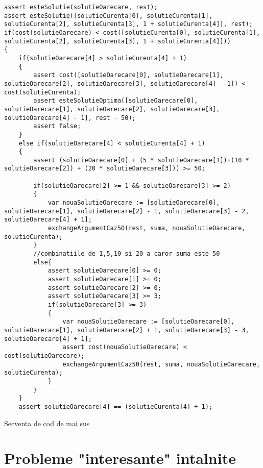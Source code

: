 \begin{enumerate}
\begin{lstlisting}
assert esteSolutie(solutieOarecare, rest);
assert esteSolutie([solutieCurenta[0], solutieCurenta[1], solutieCurenta[2], solutieCurenta[3], 1 + solutieCurenta[4]], rest);
if(cost(solutieOarecare) < cost([solutieCurenta[0], solutieCurenta[1], solutieCurenta[2], solutieCurenta[3], 1 + solutieCurenta[4]]))
{
	if(solutieOarecare[4] > solutieCurenta[4] + 1)
	{
		assert cost([solutieOarecare[0], solutieOarecare[1], solutieOarecare[2], solutieOarecare[3], solutieOarecare[4] - 1]) < cost(solutieCurenta);
		assert esteSolutieOptima([solutieOarecare[0], solutieOarecare[1], solutieOarecare[2], solutieOarecare[3], solutieOarecare[4] - 1], rest - 50);
		assert false;
	}
	else if(solutieOarecare[4] < solutieCurenta[4] + 1)
	{
		assert (solutieOarecare[0] + (5 * solutieOarecare[1])+(10 * solutieOarecare[2]) + (20 * solutieOarecare[3])) >= 50;
		
		if(solutieOarecare[2] >= 1 && solutieOarecare[3] >= 2)
		{
			var nouaSolutieOarecare := [solutieOarecare[0], solutieOarecare[1], solutieOarecare[2] - 1, solutieOarecare[3] - 2, solutieOarecare[4] + 1];
			exchangeArgumentCaz50(rest, suma, nouaSolutieOarecare, solutieCurenta);
		}
		//combinatiile de 1,5,10 si 20 a caror suma este 50
		else{
			assert solutieOarecare[0] >= 0;
			assert solutieOarecare[1] >= 0;
			assert solutieOarecare[2] >= 0;
			assert solutieOarecare[3] >= 3;
			if(solutieOarecare[3] >= 3)
			{
				var nouaSolutieOarecare := [solutieOarecare[0], solutieOarecare[1], solutieOarecare[2] + 1, solutieOarecare[3] - 3, solutieOarecare[4] + 1];
				assert cost(nouaSolutieOarecare) < cost(solutieOarecare);
				exchangeArgumentCaz50(rest, suma, nouaSolutieOarecare, solutieCurenta);
			}
		}
	}
	assert solutieOarecare[4] == (solutieCurenta[4] + 1);

\end{lstlisting}
\par
Secventa de cod de mai sus 


\end{enumerate}




\section{Probleme "interesante" intalnite}




